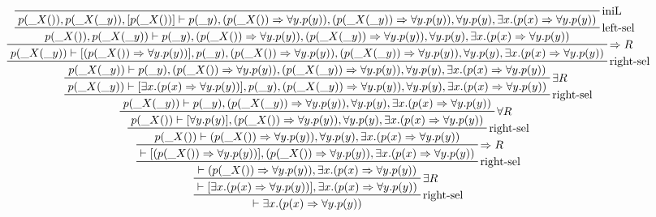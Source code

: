 \documentclass[13pt]{article}
\begin{document}
$
\prftree[r]{right-sel}
{\prftree[r]{$\exists R$}
{\prftree[r]{right-sel}
{\prftree[r]{$\Rightarrow R$}
{\prftree[r]{right-sel}
{\prftree[r]{$\forall R$}
{\prftree[r]{right-sel}
{\prftree[r]{$\exists R$}
{\prftree[r]{right-sel}
{\prftree[r]{$\Rightarrow R$}
{\prftree[r]{left-sel}
{\prftree[r]{iniL}{}
{p(\_X()),p(\_X(\_y)),[p(\_X())]\vdash p(\_y),(p(\_X())\Rightarrow \forall y.p(y)),(p(\_X(\_y))\Rightarrow \forall y.p(y)),\forall y.p(y),\exists x.(p(x)\Rightarrow \forall y.p(y))}}
{p(\_X()),p(\_X(\_y))\vdash p(\_y),(p(\_X())\Rightarrow \forall y.p(y)),(p(\_X(\_y))\Rightarrow \forall y.p(y)),\forall y.p(y),\exists x.(p(x)\Rightarrow \forall y.p(y))}}
{p(\_X(\_y))\vdash [(p(\_X())\Rightarrow \forall y.p(y))],p(\_y),(p(\_X())\Rightarrow \forall y.p(y)),(p(\_X(\_y))\Rightarrow \forall y.p(y)),\forall y.p(y),\exists x.(p(x)\Rightarrow \forall y.p(y))}}
{p(\_X(\_y))\vdash p(\_y),(p(\_X())\Rightarrow \forall y.p(y)),(p(\_X(\_y))\Rightarrow \forall y.p(y)),\forall y.p(y),\exists x.(p(x)\Rightarrow \forall y.p(y))}}
{p(\_X(\_y))\vdash [\exists x.(p(x)\Rightarrow \forall y.p(y))],p(\_y),(p(\_X(\_y))\Rightarrow \forall y.p(y)),\forall y.p(y),\exists x.(p(x)\Rightarrow \forall y.p(y))}}
{p(\_X(\_y))\vdash p(\_y),(p(\_X(\_y))\Rightarrow \forall y.p(y)),\forall y.p(y),\exists x.(p(x)\Rightarrow \forall y.p(y))}}
{p(\_X())\vdash [\forall y.p(y)],(p(\_X())\Rightarrow \forall y.p(y)),\forall y.p(y),\exists x.(p(x)\Rightarrow \forall y.p(y))}}
{p(\_X())\vdash (p(\_X())\Rightarrow \forall y.p(y)),\forall y.p(y),\exists x.(p(x)\Rightarrow \forall y.p(y))}}
{\vdash [(p(\_X())\Rightarrow \forall y.p(y))],(p(\_X())\Rightarrow \forall y.p(y)),\exists x.(p(x)\Rightarrow \forall y.p(y))}}
{\vdash (p(\_X())\Rightarrow \forall y.p(y)),\exists x.(p(x)\Rightarrow \forall y.p(y))}}
{\vdash [\exists x.(p(x)\Rightarrow \forall y.p(y))],\exists x.(p(x)\Rightarrow \forall y.p(y))}}
{\vdash \exists x.(p(x)\Rightarrow \forall y.p(y))}%
$
\end{document}
